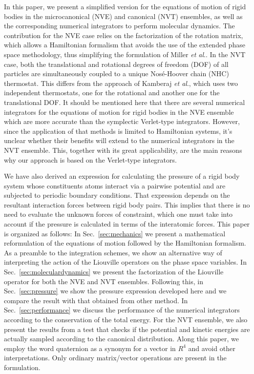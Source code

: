 \documentclass[aip,jcp,reprint,amsmath,amssymb]{revtex4-1}
\begin{document}
In this paper, we present a simplified version for the equations of motion of rigid bodies in the microcanonical (NVE) and canonical (NVT) ensembles, as well as the corresponding numerical integrators to perform molecular dynamics. The contribution for the NVE case relies on the factorization of the rotation matrix, which allows a Hamiltonian formalism that avoids the use of the extended phase space methodology, thus simplifying the formulation of Miller \textit{et al}.\cite{Miller2002}. In the NVT case, both the translational and rotational degrees of freedom (DOF) of all particles are simultaneously coupled to a unique Nos\'{e}-Hoover chain (NHC) thermostat. This differs from the approach of Kamberaj \textit{et al}.\cite{Kamberaj2005}, which uses two independent thermostats, one for the rotational and another one for the translational DOF. It should be mentioned here that there are several numerical integrators\cite{Omelyan2007,Omelyan2008,vanZon2008} for the equations of motion for rigid bodies in the NVE ensemble which are more accurate than the symplectic Verlet-type integrators. However, since the application of that methods is limited to Hamiltonian systems, it's unclear whether their benefits will extend to the numerical integrators in the NVT ensemble. This, together with its great applicability, are the main reasons why our approach is based on the Verlet-type integrators.

We have also derived an expression for calculating the pressure of a rigid body system whose constituents atoms interact via a pairwise potential and are subjected to periodic boundary conditions. That expression depends on the resultant interaction forces between rigid body pairs. This implies that there is no need to evaluate the unknown forces of constraint, which one must take into account if the pressure is calculated in terms of the interatomic forces. This paper is organized as follows: In Sec.~\ref{sec:mechanics} we present a mathematical reformulation of the equations of motion followed by the Hamiltonian formalism. As a preamble to the integration schemes, we show an alternative way of interpreting the action of the Liouville operators on the phase space variables. In Sec.~\ref{sec:moleculardynamics} we present the factorization of the Liouville operator for both the NVE and NVT ensembles. Following this, in Sec.~\ref{sec:pressure} we show the pressure expression developed here and we compare the result with that obtained from other method. In Sec.~\ref{sec:performance} we discuss the performance of the numerical integrators according to the conservation of the total energy. For the NVT ensemble, we also present the results from a test that checks if the potential and kinetic energies are actually sampled according to the canonical distribution. Along this paper, we employ the word quaternion as a synonym for a vector in $R^4$ and avoid other interpretations. Only ordinary matrix/vector operations are present in the formulation.
\end{document}
